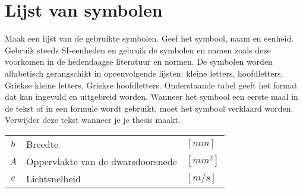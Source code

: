 
\chapter*{Lijst van symbolen}

Maak een lijst van de gebruikte symbolen. Geef het symbool, naam en eenheid. Gebruik steeds SI-eenheden en gebruik de symbolen en namen zoals deze voorkomen in de hedendaagse literatuur en normen. De symbolen worden alfabetisch gerangschikt in opeenvolgende lijsten: kleine letters, hoofdletters, Griekse kleine letters, Griekse hoofdletters. Onderstaande tabel geeft het format dat kan ingevuld en uitgebreid worden. Wanneer het symbool een eerste maal in de tekst of in een formule wordt gebruikt, moet het symbool verklaard worden. Verwijder deze tekst wanneer je je thesis maakt.


\begin{table}[!h]
	\begin{tabular}{cll}
		$b$ & Breedte & $[mm]$\\
		$A$ & Oppervlakte van de dwarsdoorsnede & $[mm^2]$\\
		$c$ & Lichtsnelheid & $[m/s]$\\
	\end{tabular}
\end{table}


